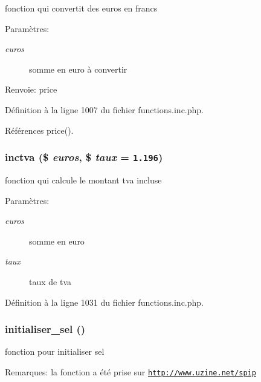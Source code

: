 fonction qui convertit des euros en francs 

\begin{Desc}
\item[Param\`{e}tres:]
\begin{description}
\item[{\em euros}]somme en euro \`{a} convertir \end{description}
\end{Desc}
\begin{Desc}
\item[Renvoie:]price \end{Desc}


D\'{e}finition \`{a} la ligne 1007 du fichier functions.inc.php.

R\'{e}f\'{e}rences price().\hypertarget{functions_8inc_8php_a41}{
\subsubsection[inctva]{\setlength{\rightskip}{0pt plus 5cm}inctva (\$ {\em euros}, \$ {\em taux} = {\tt 1.196})}}
\label{functions_8inc_8php_a41}


fonction qui calcule le montant tva incluse 

\begin{Desc}
\item[Param\`{e}tres:]
\begin{description}
\item[{\em euros}]somme en euro \item[{\em taux}]taux de tva \end{description}
\end{Desc}


D\'{e}finition \`{a} la ligne 1031 du fichier functions.inc.php.\hypertarget{functions_8inc_8php_a46}{
\subsubsection[initialiser\_\-sel]{\setlength{\rightskip}{0pt plus 5cm}initialiser\_\-sel ()}}
\label{functions_8inc_8php_a46}


fonction pour initialiser sel 

\begin{Desc}
\item[Remarques:]la fonction a \'{e}t\'{e} prise sur \href{http://www.uzine.net/spip}{\tt http://www.uzine.net/spip} \end{Desc}


